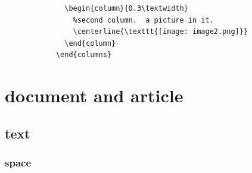 \documentclass[a4paper,12pt,twoside]{book}
\begin{document}
\begin{itemize}
\begin{verbatim}
			  \begin{column}{0.3\textwidth}
			    %second column.  a picture in it.
			    \centerline{\texttt{[image: image2.png]}}
			  \end{column}
			\end{columns}
		\end{verbatim}
	\end{itemize}


\section{document and article}	
	\subsection{text}
		\subsubsection{space}
\end{document}
